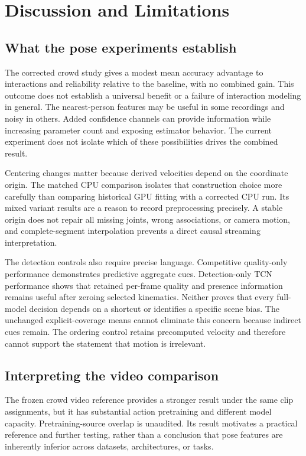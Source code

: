 \section{Discussion and Limitations}
\subsection{What the pose experiments establish}
The corrected crowd study gives a modest mean accuracy advantage to interactions and reliability relative to the baseline, with no combined gain. This outcome does not establish a universal benefit or a failure of interaction modeling in general. The nearest-person features may be useful in some recordings and noisy in others. Added confidence channels can provide information while increasing parameter count and exposing estimator behavior. The current experiment does not isolate which of these possibilities drives the combined result.

Centering changes matter because derived velocities depend on the coordinate origin. The matched CPU comparison isolates that construction choice more carefully than comparing historical GPU fitting with a corrected CPU run. Its mixed variant results are a reason to record preprocessing precisely. A stable origin does not repair all missing joints, wrong associations, or camera motion, and complete-segment interpolation prevents a direct causal streaming interpretation.

The detection controls also require precise language. Competitive quality-only performance demonstrates predictive aggregate cues. Detection-only TCN performance shows that retained per-frame quality and presence information remains useful after zeroing selected kinematics. Neither proves that every full-model decision depends on a shortcut or identifies a specific scene bias. The unchanged explicit-coverage means cannot eliminate this concern because indirect cues remain. The ordering control retains precomputed velocity and therefore cannot support the statement that motion is irrelevant.

\subsection{Interpreting the video comparison}
The frozen crowd video reference provides a stronger result under the same clip assignments, but it has substantial action pretraining and different model capacity. Pretraining-source overlap is unaudited. Its result motivates a practical reference and further testing, rather than a conclusion that pose features are inherently inferior across datasets, architectures, or tasks.

